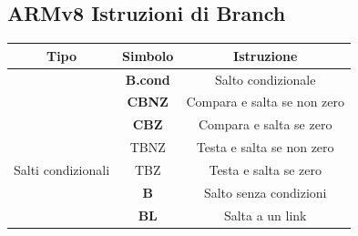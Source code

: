 \documentclass[12pt,a4paper]{article}
\begin{document}
\subsection{ARMv8 Istruzioni di Branch}
\Sep
\begin{center}
\begin{tabular}{|c|c|c|}
\hline
\rowcolor[HTML]{FFCB2F} 
Tipo                                                                                                         & Simbolo         & Istruzione                                                                                                \\ \hline
                                                                                                             & \textbf{B.cond} & Salto condizionale                                                                                        \\ \cline{2-3} 
                                                                                                             & \textbf{CBNZ}   & Compara e salta se non zero                                                                               \\ \cline{2-3} 
                                                                                                             & \textbf{CBZ}    & Compara e salta se zero                                                                                   \\ \cline{2-3} 
                                                                                                             & TBNZ            & Testa e salta se non zero                                                                                 \\ \cline{2-3} 
\multirow{-5}{*}{Salti condizionali}                                                                         & TBZ             & Testa e salta se zero                                                                                     \\ \hline
                                                                                                             & \textbf{B}      & Salto senza condizioni                                                                                    \\ \cline{2-3} 
                                                                                                             & \textbf{BL}     & Salta a un link                                                                                           \\ \cline{2-3} 

\end{tabular}
\end{center}
\end{document}
